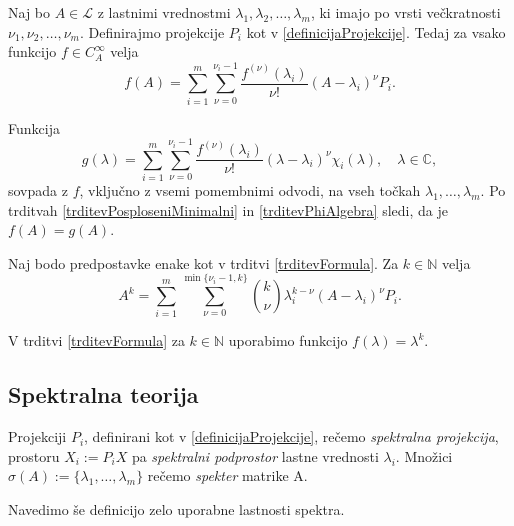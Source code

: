 \documentclass[mat1]{fmfdelo}
\newcommand{\N}{\mathbb N}
\newcommand{\C}{\mathbb C}
\begin{document}
\begin{trditev} \label{trditevFormula}
    Naj bo $A \in \mathcal{L}$ z lastnimi vrednostmi $\lambda_1, \lambda_2, \ldots, \lambda_m$, ki imajo po vrsti večkratnosti $\nu_1, \nu_2, \ldots, \nu_m$. Definirajmo projekcije $P_i$ kot v \eqref{definicijaProjekcije}. Tedaj za vsako funkcijo $f \in C_A^\infty$ velja
    \begin{equation}
        f(A) = \sum_{i=1}^m \sum_{\nu = 0}^{\nu_i - 1} \frac{f^{(\nu)}(\lambda_i)}{\nu !}(A - \lambda_i)^\nu P_i.
    \end{equation}
\end{trditev}
\begin{dokaz}
    Funkcija
    \begin{equation}
        g(\lambda) = \sum_{i=1}^m \sum_{\nu = 0}^{\nu_i - 1} \frac{f^{(\nu)}(\lambda_i)}{\nu !}(\lambda - \lambda_i)^\nu \chi_i(\lambda), \quad \lambda \in \C,
    \end{equation}
    sovpada z $f$, vključno z vsemi pomembnimi odvodi, na vseh točkah $\lambda_1, \ldots, \lambda_m$.  Po trditvah \ref{trditevPosploseniMinimalni} in \ref{trditevPhiAlgebra} sledi, da je $f(A) = g(A)$.
\end{dokaz}
\begin{posledica}
    Naj bodo predpostavke enake kot v trditvi \ref{trditevFormula}. Za $k \in \N$ velja
    \begin{equation}
        A^k = \sum_{i=1}^m \sum_{\nu = 0}^{\min \{\nu_i - 1, k\}} {k \choose \nu} \lambda_i^{k-\nu}(A - \lambda_i)^\nu P_i.
    \end{equation}
\end{posledica}
\begin{dokaz}
    V trditvi \ref{trditevFormula} za $k \in \N$ uporabimo funkcijo $f(\lambda) = \lambda^k$.
\end{dokaz}

\subsection{Spektralna teorija}


\begin{definicija}
Projekciji $P_i$, definirani kot v \eqref{definicijaProjekcije}, rečemo \emph{spektralna projekcija}, prostoru $X_i := P_i X$ pa \emph{spektralni podprostor} lastne vrednosti $\lambda_i$. Množici $\sigma(A) := \{\lambda_1, \ldots, \lambda_m\}$ rečemo \emph{spekter} matrike A.
\end{definicija}

Navedimo še definicijo zelo uporabne lastnosti spektra.
\end{document}
